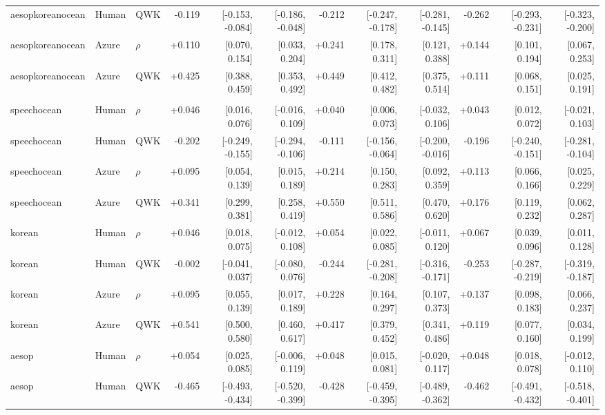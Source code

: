 \begin{landscape}
\begin{longtable}{@{}lllrrrrrrrrr@{}}
aesopkoreanocean & Human & QWK & -0.119 & [-0.153, -0.084] & [-0.186, -0.048] & -0.212 & [-0.247, -0.178] & [-0.281, -0.145] & -0.262 & [-0.293, -0.231] & [-0.323, -0.200]\\
aesopkoreanocean & Azure & $\rho$ & +0.110 & [0.070, 0.154] & [0.033, 0.204] & +0.241 & [0.178, 0.311] & [0.121, 0.388] & +0.144 & [0.101, 0.194] & [0.067, 0.253]\\
aesopkoreanocean & Azure & QWK & +0.425 & [0.388, 0.459] & [0.353, 0.492] & +0.449 & [0.412, 0.482] & [0.375, 0.514] & +0.111 & [0.068, 0.151] & [0.025, 0.191]\\
\addlinespace[2pt]
\midrule\multicolumn{12}{l}{\textbf{D: 1-grid accuracy MAE}}\\*
speechocean & Human & $\rho$ & +0.046 & [0.016, 0.076] & [-0.016, 0.109] & +0.040 & [0.006, 0.073] & [-0.032, 0.106] & +0.043 & [0.012, 0.072] & [-0.021, 0.103]\\
speechocean & Human & QWK & -0.202 & [-0.249, -0.155] & [-0.294, -0.106] & -0.111 & [-0.156, -0.064] & [-0.200, -0.016] & -0.196 & [-0.240, -0.151] & [-0.281, -0.104]\\
speechocean & Azure & $\rho$ & +0.095 & [0.054, 0.139] & [0.015, 0.189] & +0.214 & [0.150, 0.283] & [0.092, 0.359] & +0.113 & [0.066, 0.166] & [0.025, 0.229]\\
speechocean & Azure & QWK & +0.341 & [0.299, 0.381] & [0.258, 0.419] & +0.550 & [0.511, 0.586] & [0.470, 0.620] & +0.176 & [0.119, 0.232] & [0.062, 0.287]\\
\addlinespace[2pt]
korean & Human & $\rho$ & +0.046 & [0.018, 0.075] & [-0.012, 0.108] & +0.054 & [0.022, 0.085] & [-0.011, 0.120] & +0.067 & [0.039, 0.096] & [0.011, 0.128]\\
korean & Human & QWK & -0.002 & [-0.041, 0.037] & [-0.080, 0.076] & -0.244 & [-0.281, -0.208] & [-0.316, -0.171] & -0.253 & [-0.287, -0.219] & [-0.319, -0.187]\\
korean & Azure & $\rho$ & +0.095 & [0.055, 0.139] & [0.017, 0.189] & +0.228 & [0.164, 0.297] & [0.107, 0.373] & +0.137 & [0.098, 0.183] & [0.066, 0.237]\\
korean & Azure & QWK & +0.541 & [0.500, 0.580] & [0.460, 0.617] & +0.417 & [0.379, 0.452] & [0.341, 0.486] & +0.119 & [0.077, 0.160] & [0.034, 0.199]\\
\addlinespace[2pt]
aesop & Human & $\rho$ & +0.054 & [0.025, 0.085] & [-0.006, 0.119] & +0.048 & [0.015, 0.081] & [-0.020, 0.117] & +0.048 & [0.018, 0.078] & [-0.012, 0.110]\\
aesop & Human & QWK & -0.465 & [-0.493, -0.434] & [-0.520, -0.399] & -0.428 & [-0.459, -0.395] & [-0.489, -0.362] & -0.462 & [-0.491, -0.432] & [-0.518, -0.401]\\

\end{longtable}
\end{landscape}
